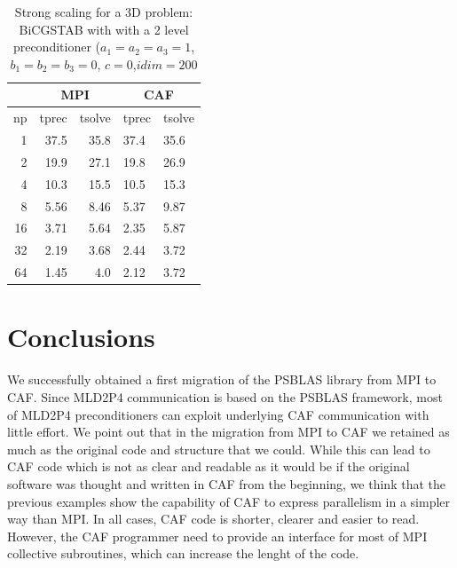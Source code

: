 \documentclass{IOS-Book-Article}
\begin{document}
\begin{table}[]
\centering
\caption{Strong scaling for a 3D problem: BiCGSTAB with with a 2 level preconditioner ($a_1=a_2=a_3=1$, $b_1=b_2=b_3=0$, $c=0$,$idim=200$}
\label{Strong2}
\begin{tabular}{@{}rrrll@{}}
\multicolumn{1}{l}{}   & \multicolumn{2}{c}{MPI}                                & \multicolumn{2}{c}{CAF} \\ \midrule
\multicolumn{1}{c}{np} & \multicolumn{1}{c}{tprec} & \multicolumn{1}{c}{tsolve} & tprec      & tsolve     \\ \midrule
1                      & 37.5                      & 35.8                       & 37.4       & 35.6       \\
2                      & 19.9                      & 27.1                       & 19.8       & 26.9       \\
4                      & 10.3                      & 15.5                       & 10.5       & 15.3       \\
8                      & 5.56                      & 8.46                       & 5.37       & 9.87       \\
16                     & 3.71                      & 5.64                       & 2.35       & 5.87       \\
32                     & 2.19                      & 3.68                       & 2.44       & 3.72       \\
64                     & 1.45                      & 4.0                        & 2.12       & 3.72       \\ \bottomrule
\end{tabular}
\end{table} 
  
\section{Conclusions}

We successfully obtained a first migration of the  PSBLAS library from
MPI to CAF. Since MLD2P4 
communication is based on the PSBLAS framework, most of MLD2P4
preconditioners can exploit underlying CAF communication with little
effort. We point out that in the migration from MPI to CAF we retained
as much as the original code and structure that we could. While this
can lead to CAF code which is not as clear and readable as it would be
if the original software was thought and written in CAF from the
beginning, we think that the previous examples show the capability of
CAF to express parallelism in a simpler way than MPI. In all cases,
CAF code is shorter, clearer and easier to read. However, the CAF
programmer need to provide an interface for most of MPI collective
subroutines, which can increase the lenght of the code.  
\end{document}
